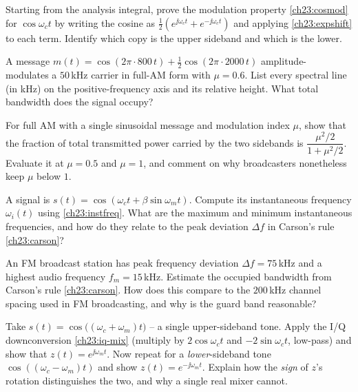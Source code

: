 \begin{exercise}
\label{ch23:ex-shift}
Starting from the analysis integral, prove the modulation property
\eqref{ch23:cosmod} for $\cos\omega_c t$ by writing the cosine as
$\tfrac12(e^{\jj\omega_c t}+e^{-\jj\omega_c t})$ and applying \eqref{ch23:expshift} to
each term. Identify which copy is the upper sideband and which is the lower.
\end{exercise}

\begin{exercise}
\label{ch23:ex-twotone}
A message $m(t)=\cos(2\pi\cdot 800\,t)+\tfrac12\cos(2\pi\cdot 2000\,t)$ amplitude-
modulates a $50\,$kHz carrier in full-AM form with $\mu=0.6$. List every spectral line
(in kHz) on the positive-frequency axis and its relative height. What total bandwidth does
the signal occupy?
\end{exercise}

\begin{exercise}
\label{ch23:ex-power}
For full AM with a single sinusoidal message and modulation index $\mu$, show that the
fraction of total transmitted power carried by the two sidebands is
$\dfrac{\mu^2/2}{1+\mu^2/2}$. Evaluate it at $\mu=0.5$ and $\mu=1$, and comment on why
broadcasters nonetheless keep $\mu$ below $1$.
\end{exercise}

\begin{exercise}
\label{ch23:ex-instf}
A signal is $s(t)=\cos(\omega_c t + \beta\sin\omega_m t)$. Compute its instantaneous
frequency $\omega_i(t)$ using \eqref{ch23:instfreq}. What are the maximum and minimum
instantaneous frequencies, and how do they relate to the peak deviation $\Delta f$ in
Carson's rule \eqref{ch23:carson}?
\end{exercise}

\begin{exercise}
\label{ch23:ex-carson}
An FM broadcast station has peak frequency deviation $\Delta f = 75\,$kHz and a highest
audio frequency $f_m = 15\,$kHz. Estimate the occupied bandwidth from Carson's rule
\eqref{ch23:carson}. How does this compare to the $200\,$kHz channel spacing used in FM
broadcasting, and why is the guard band reasonable?
\end{exercise}

\begin{exercise}
\label{ch23:ex-iq}
Take $s(t)=\cos\!\big((\omega_c+\omega_m)t\big)$ -- a single upper-sideband tone. Apply
the I/Q downconversion \eqref{ch23:iq-mix} (multiply by $2\cos\omega_c t$ and
$-2\sin\omega_c t$, low-pass) and show that $z(t)=e^{\jj\omega_m t}$. Now repeat for a
\emph{lower}-sideband tone $\cos((\omega_c-\omega_m)t)$ and show $z(t)=e^{-\jj\omega_m
t}$. Explain how the \emph{sign} of $z$'s rotation distinguishes the two, and why a single
real mixer cannot.
\end{exercise}

